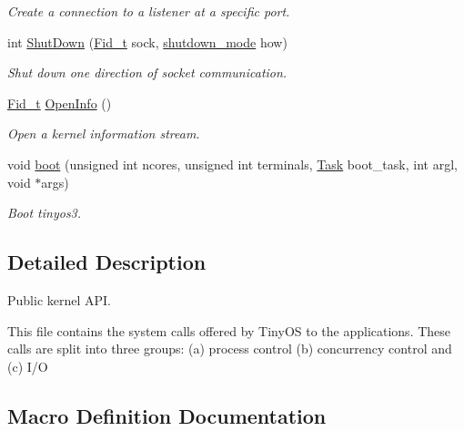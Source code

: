 \begin{DoxyCompactItemize}
\begin{DoxyCompactList}\small\item\em Create a connection to a listener at a specific port. \end{DoxyCompactList}\item 
int \hyperlink{group__syscalls_ga61d49d63d8c0f9fc0917cc1bda6fdfcb}{Shut\+Down} (\hyperlink{group__syscalls_ga5097222c5f0da97d92d4712359abc38f}{Fid\+\_\+t} sock, \hyperlink{group__syscalls_ga9eb10a0a72ca3149140272e9344a272b}{shutdown\+\_\+mode} how)
\begin{DoxyCompactList}\small\item\em Shut down one direction of socket communication. \end{DoxyCompactList}\item 
\hyperlink{group__syscalls_ga5097222c5f0da97d92d4712359abc38f}{Fid\+\_\+t} \hyperlink{group__syscalls_gaf326b11574cdc84a9e21b9d860076821}{Open\+Info} ()
\begin{DoxyCompactList}\small\item\em Open a kernel information stream. \end{DoxyCompactList}\item 
void \hyperlink{group__syscalls_ga31d9ee7df9665928617a9f9c0cc6d361}{boot} (unsigned int ncores, unsigned int terminals, \hyperlink{group__syscalls_gaec3f2f835e105271fbbc00272c0ba984}{Task} boot\+\_\+task, int argl, void $\ast$args)
\begin{DoxyCompactList}\small\item\em Boot tinyos3. \end{DoxyCompactList}\end{DoxyCompactItemize}


\subsection{Detailed Description}
Public kernel A\+PI. 

This file contains the system calls offered by Tiny\+OS to the applications. These calls are split into three groups\+: (a) process control (b) concurrency control and (c) I/O 

\subsection{Macro Definition Documentation}

